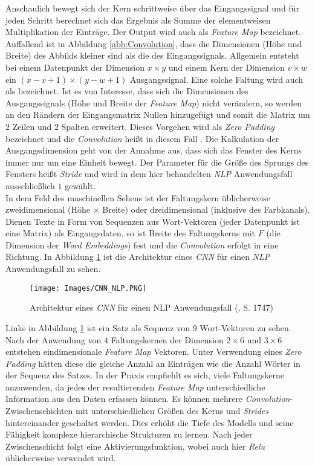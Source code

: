 \documentclass[a4paper,11pt]{article}
\begin{document}
Anschaulich bewegt sich der Kern schrittweise über das Eingangssignal und für jeden Schritt berechnet sich das Ergebnis als Summe der elementweisen Multiplikation der Einträge. Der Output wird auch als \textit{Feature Map} bezeichnet. Auffallend ist in Abbildung \ref{abb:Convolution}, dass die Dimensionen (Höhe und Breite) des Abbilds kleiner sind als die des Eingangssignals. Allgemein entsteht bei einem Datenpunkt der Dimension $x \times y$ und einem Kern der Dimension $v \times w$ ein $(x-v + 1) \times (y - w +1)$ Ausgangssignal. Eine solche Faltung wird auch als  bezeichnet. Ist es von Interesse, dass sich die Dimensionen des Ausgangssignals (Höhe und Breite der \textit{Feature Map}) nicht verändern, so werden an den Rändern der Eingangsmatrix Nullen hinzugefügt und somit die Matrix um $2$ Zeilen und $2$ Spalten erweitert. Dieses Vorgehen wird als \textit{Zero Padding} bezeichnet und die \textit{Convolution} heißt in diesem Fall . Die Kalkulation der Ausgangsdimension geht von der Annahme aus, dass sich das Fenster des Kerns immer nur um eine Einheit bewegt. Der Parameter für die Größe des Sprungs des Fensters heißt \textit{Stride} und wird in dem hier behandelten \textit{NLP} Anwendungsfall ausschließlich $1$ gewählt. \\
In dem Feld des maschinellen Sehens ist der Faltungskern üblicherweise zweidimensional (Höhe $\times$ Breite) oder dreidimensional (inklusive des Farbkanals). Dienen Texte in Form von Sequenzen aus Wort-Vektoren (jeder Datenpunkt ist eine Matrix) als Eingangsdaten, so ist Breite des Faltungskerns mit $F$ (die Dimension der \textit{Word Embeddings}) fest und die \textit{Convolution} erfolgt in eine Richtung. In Abbildung \ref{abb:CNN_NLP} ist die Architektur eines \textit{CNN} für einen \textit{NLP} Anwendungsfall zu sehen.

\begin{figure}[!ht]
\begin{center}
\texttt{[image: Images/CNN\_NLP.PNG]}
\caption{Architektur eines \textit{CNN} für einen NLP Anwendungsfall (\cite{cnnSentence}, S. 1747)}
\label{abb:CNN_NLP}
\end{center}
\end{figure}

Links in Abbildung \ref{abb:CNN_NLP} ist ein Satz als Sequenz von $9$ Wort-Vektoren zu sehen. Nach der Anwendung von $4$ Faltungskernen der Dimension $2 \times 6$ und $3 \times 6$ entstehen eindimensionale \textit{Feature Map} Vektoren. Unter Verwendung eines \textit{Zero Padding} hätten diese die gleiche Anzahl an Einträgen wie die Anzahl Wörter in der Sequenz des Satzes. 
In der Praxis empfiehlt es sich, viele Faltungskerne anzuwenden, da jedes der resultierenden \textit{Feature Map} unterschiedliche Information aus den Daten erfassen können. Es können mehrere \textit{Convolution}-Zwischenschichten mit unterschiedlichen Größen des Kerns und \textit{Strides} hintereinander geschaltet werden. Dies erhöht die Tiefe des Modells und seine Fähigkeit komplexe hierarchische Strukturen zu lernen. Nach jeder Zwischenschicht folgt eine Aktivierungsfunktion, wobei auch hier \textit{Relu} üblicherweise verwendet wird.
\end{document}
